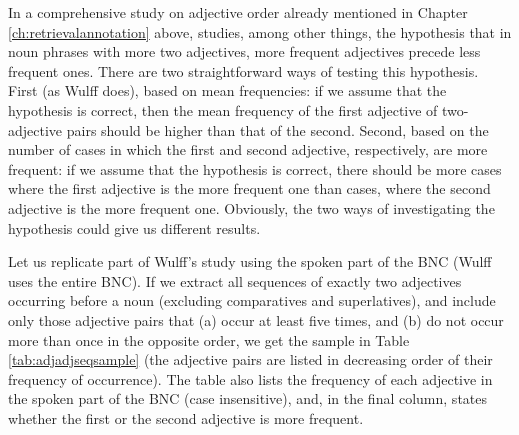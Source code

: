 In a comprehensive study on adjective order already mentioned in Chapter \ref{ch:retrievalannotation} above, \citet{wulff_multifactorial_2003} studies, among other things, the hypothesis that in noun phrases with more two adjectives, more frequent adjectives precede less frequent ones. There are two straightforward ways of testing this hypothesis. First (as Wulff does), based on mean frequencies: if we assume that the hypothesis is correct, then the mean frequency of the first adjective of two-adjective pairs should be higher than that of the second. Second, based on the number of cases in which the first and second adjective, respectively, are more frequent: if we assume that the hypothesis is correct, there should be more cases where the first adjective is the more frequent one than cases, where the second adjective is the more frequent one. Obviously, the two ways of investigating the hypothesis could give us different results.

Let us replicate part of Wulff's study using the spoken part of the BNC (Wulff uses the entire BNC). If we extract all sequences of exactly two adjectives occurring before a noun (excluding comparatives and superlatives), and include only those adjective pairs that (a) occur at least five times, and (b) do not occur more than once in the opposite order, we get the sample in Table \ref{tab:adjadjseqsample} (the adjective pairs are listed in decreasing order of their frequency of occurrence). The table also lists the frequency of each adjective in the spoken part of the BNC (case insensitive), and, in the final column, states whether the first or the second adjective is more frequent.

